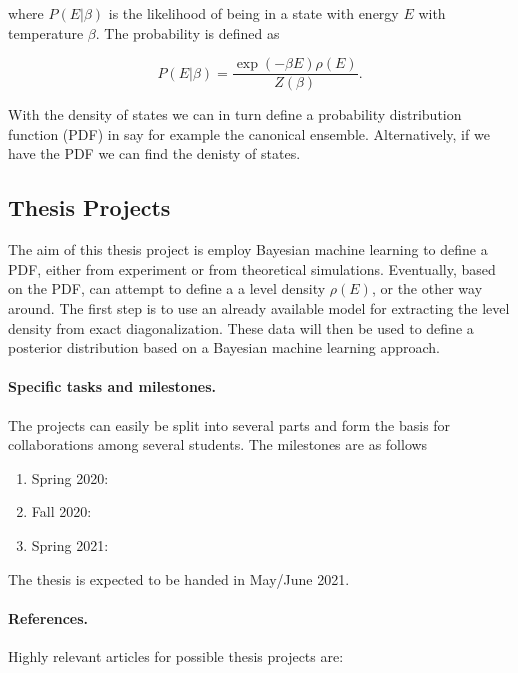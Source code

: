 \documentclass[%
oneside,                 %
final,                   %
10pt]{article}
\begin{document}
where $P(E\vert\beta)$ is the likelihood of being in a state with
energy $E$ with temperature $\beta$. The probability is defined as

\[
P(E\vert\beta) = \frac{\exp{(-\beta E)}\rho(E)}{Z(\beta)}. 
\]

With the density of states we can in turn define a probability distribution function (PDF) in say for example the canonical ensemble. Alternatively, if we have the PDF we can find the denisty of states.




\subsection{Thesis Projects}

The aim of this thesis project is employ Bayesian machine learning to
define a PDF, either from experiment or from theoretical simulations.
Eventually, based on the PDF, can attempt to define a a level density
$\rho(E)$, or the other way around. The first step is to use an
already available model for extracting the level density from exact
diagonalization. These data will then be used to define a posterior
distribution based on a Bayesian machine learning approach.






\paragraph{Specific tasks and milestones.}
The projects can easily be split into several parts and form the basis for collaborations among several students. The milestones are as follows
\begin{enumerate}
\item Spring 2020: 

\item Fall 2020: 

\item Spring 2021: 
\end{enumerate}

\noindent
The thesis is expected to be handed in May/June  2021.

\paragraph{References.}
Highly relevant articles for possible thesis projects are:



\end{document}
